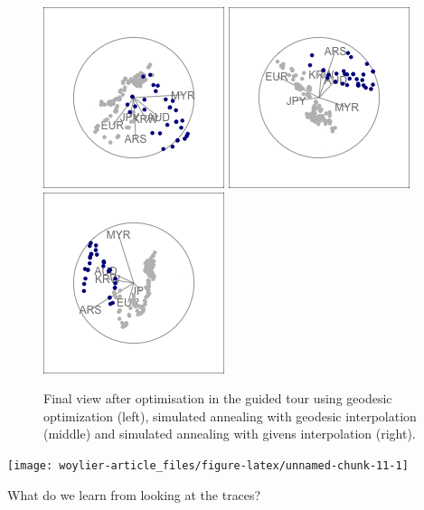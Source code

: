 \begin{Schunk}
\begin{figure}

{\centering \includegraphics[width=0.3\linewidth]{rates_tour_geodesic_final} \includegraphics[width=0.3\linewidth]{rates_tour_better_final} \includegraphics[width=0.3\linewidth]{rates_tour_givens_final} 

}

\caption[Final view after optimisation in the guided tour using geodesic optimization (left), simulated annealing with geodesic interpolation (middle) and simulated annealing with givens interpolation (right)]{Final view after optimisation in the guided tour using geodesic optimization (left), simulated annealing with geodesic interpolation (middle) and simulated annealing with givens interpolation (right).}\label{fig:rates-tour-static}
\end{figure}
\end{Schunk}

\begin{Schunk}

\texttt{[image: woylier-article\_files/figure-latex/unnamed-chunk-11-1]} \end{Schunk}

What do we learn from looking at the traces?

